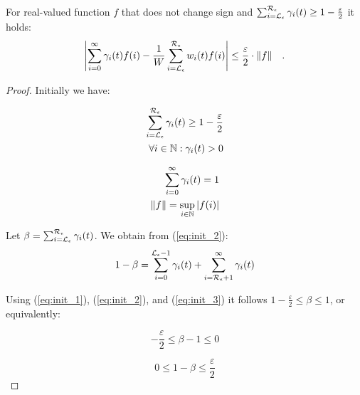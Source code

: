 \documentclass{entcs}
\begin{document}
	\begin{proposition}
		For real-valued function $f$ that does not change sign and $\sum_{i=\mathcal{L}_{\epsilon}}^{\mathcal{R}_{\epsilon}} \gamma_{i}(t) \geq 1 - \frac{\varepsilon}{2}$ it holds:
		{\small
		\[
			\left| \sum_{i=0}^{\infty} \gamma_{i}(t) f(i) - \frac{1}{W}\sum_{i = \mathcal{L}_{\epsilon}}^{\mathcal{R}_{\epsilon}} w_{i}(t) f(i) \right| \leq \frac{\varepsilon}{2} \cdot \|f\| \quad .
		\]
		}
		\label{pr:fg_imp}
	\end{proposition}
	{\small
	\begin{proof}
		Initially we have:
		
		\begin{minipage}[t]{0.45\linewidth}
			\begin{eqnarray}
				\sum_{i=\mathcal{L}_{\epsilon}}^{\mathcal{R}_{\epsilon}} \gamma_{i}(t) \geq 1 - \frac{\varepsilon}{2} \label{eq:init_1} \\
				\forall i \in \mathbb{N} : \gamma_{i}(t) > 0 \label{eq:init_3}
			\end{eqnarray}
		\end{minipage} \hfill
		\begin{minipage}[t]{0.45\linewidth}
			\begin{eqnarray}
				\sum_{i=0}^{\infty} \gamma_{i}(t) = 1 \label{eq:init_2} \\
				\|f\| = \sup_{i \in \mathbb{N}}|f(i)| \label{eq:init_4}
			\end{eqnarray}
		\end{minipage}
		
		Let $\beta = \sum_{i=\mathcal{L}_{\epsilon}}^{\mathcal{R}_{\epsilon}} \gamma_{i}(t)$.  We obtain from (\ref{eq:init_2}):
		\begin{equation}
			1 - \beta = \sum_{i = 0}^{\mathcal{L}_{\epsilon}-1} \gamma_{i}(t) + \sum_{i = \mathcal{R}_{\epsilon}+1}^{\infty} \gamma_{i}(t) \label{eq:beta_3}
		\end{equation}
		
		Using (\ref{eq:init_1}), (\ref{eq:init_2}), and (\ref{eq:init_3}) it follows $1- \frac{\varepsilon}{2} \leq \beta \leq 1$, or equivalently:

		\begin{minipage}[t]{0.45\linewidth}
			\begin{equation}
				- \frac{\varepsilon}{2} \leq \beta -1 \leq 0  \label{eq:beta_1}
			\end{equation}
		\end{minipage} \hfill
		\begin{minipage}[t]{0.45\linewidth}
			\begin{equation}
				0 \leq 1- \beta \leq \frac{\varepsilon}{2} \label{eq:beta_2}
			\end{equation}
		\end{minipage}


\end{proof}}
\end{document}
